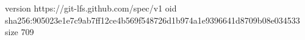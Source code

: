 version https://git-lfs.github.com/spec/v1
oid sha256:905023e1e7c9ab7ff12ce4b569f548726d1b974a1e9396641d8709b08e034533
size 709
